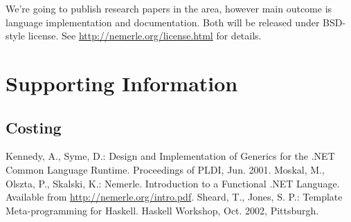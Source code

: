 \documentclass[a4paper,11pt]{article}
\begin{document}
We're going to publish research papers in the area, however main outcome
is language implementation and documentation. Both will be released
under BSD-style license. See \url{http://nemerle.org/license.html}
for details.


\section{Supporting Information}


\subsection{Costing}




\begin{thebibliography}{22}
Kennedy, A., Syme, D.:
Design and Implementation of Generics for the .NET Common Language Runtime.
Proceedings of PLDI, Jun. 2001.
Moskal, M., Olszta, P., Skalski, K.:
Nemerle. Introduction to a Functional .NET Language.
Available from \url{http://nemerle.org/intro.pdf}.
Sheard, T., Jones, S. P.:
Template Meta-programming for Haskell.
Haskell Workshop, Oct. 2002, Pittsburgh.
\end{thebibliography}
\end{document}
